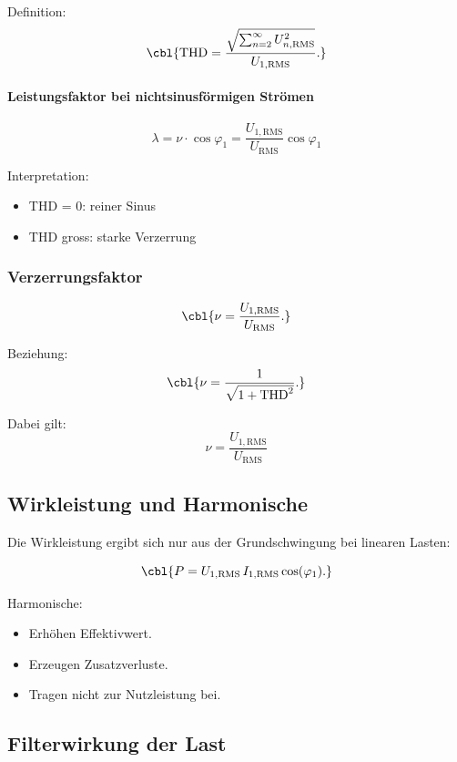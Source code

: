 Definition:
\[
\cbl{\mathrm{THD} =
\frac{\sqrt{ \sum_{n=2}^{\infty} U_{n,\mathrm{RMS}}^2 }}{U_{1,\mathrm{RMS}}}.}
\]

\paragraph{Leistungsfaktor bei nichtsinusförmigen Strömen}
\[
\lambda = \nu \cdot \cos\varphi_1 = \frac{U_{1,\mathrm{RMS}}}{U_{\mathrm{RMS}}} \cos\varphi_1
\]


Interpretation:
\begin{itemize}
    \item THD = 0: reiner Sinus
    \item THD gross: starke Verzerrung
\end{itemize}

\subsubsection{Verzerrungsfaktor}

\[
\cbl{\nu = \frac{U_{1,\mathrm{RMS}}}{U_{\mathrm{RMS}}}.}
\]

Beziehung:
\[
\cbl{\nu = \frac{1}{\sqrt{1 + \mathrm{THD}^2}}.}
\]

Dabei gilt:
\[
\nu = \frac{U_{1,\mathrm{RMS}}}{U_{\mathrm{RMS}}}
\]


\subsection{Wirkleistung und Harmonische}

Die Wirkleistung ergibt sich nur aus der Grundschwingung bei linearen Lasten:

\[
\cbl{P = U_{1,\mathrm{RMS}} \, I_{1,\mathrm{RMS}} \cos(\varphi_1).}
\]

Harmonische:
\begin{itemize}
    \item Erhöhen Effektivwert.
    \item Erzeugen Zusatzverluste.
    \item Tragen nicht zur Nutzleistung bei.
\end{itemize}


\subsection{Filterwirkung der Last}

